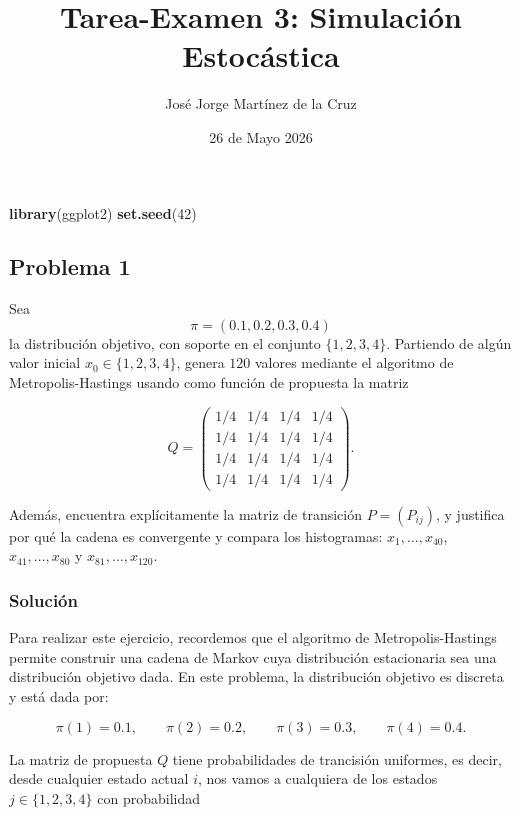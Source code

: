 \documentclass[
]{article}
\title{Tarea-Examen 3: Simulación Estocástica}
\author{José Jorge Martínez de la Cruz}
\date{26 de Mayo 2026}
\newenvironment{Shaded}{\begin{snugshade}}{\end{snugshade}}
\newcommand{\DecValTok}[1]{\textcolor[rgb]{0.00,0.00,0.81}{#1}}
\newcommand{\FunctionTok}[1]{\textcolor[rgb]{0.13,0.29,0.53}{\textbf{#1}}}
\newcommand{\NormalTok}[1]{#1}
\begin{document}
\maketitle

\begin{Shaded}
\begin{Highlighting}[]
\FunctionTok{library}\NormalTok{(ggplot2)}
\FunctionTok{set.seed}\NormalTok{(}\DecValTok{42}\NormalTok{)}
\end{Highlighting}
\end{Shaded}

\subsection{Problema 1}\label{problema-1}

Sea \[
\pi = (0.1,0.2,0.3,0.4)
\] la distribución objetivo, con soporte en el conjunto \(\{1,2,3,4\}\).
Partiendo de algún valor inicial \(x_0 \in \{1,2,3,4\}\), genera \(120\)
valores mediante el algoritmo de Metropolis-Hastings usando como función
de propuesta la matriz

\[
Q =
\begin{pmatrix}
1/4 & 1/4 & 1/4 & 1/4\\
1/4 & 1/4 & 1/4 & 1/4\\
1/4 & 1/4 & 1/4 & 1/4\\
1/4 & 1/4 & 1/4 & 1/4
\end{pmatrix}.
\]

Además, encuentra explícitamente la matriz de transición \(P=(P_{ij})\),
y justifica por qué la cadena es convergente y compara los histogramas:
\(x_1,\ldots,x_{40}\), \(x_{41},\ldots,x_{80}\) y
\(x_{81},\ldots,x_{120}\).

\subsubsection{Solución}\label{soluciuxf3n}

Para realizar este ejercicio, recordemos que el algoritmo de
Metropolis-Hastings permite construir una cadena de Markov cuya
distribución estacionaria sea una distribución objetivo dada. En este
problema, la distribución objetivo es discreta y está dada por:

\[
\pi(1)=0.1, \qquad \pi(2)=0.2, \qquad \pi(3)=0.3, \qquad \pi(4)=0.4.
\]

La matriz de propuesta \(Q\) tiene probabilidades de trancisión
uniformes, es decir, desde cualquier estado actual \(i\), nos vamos a
cualquiera de los estados \(j\in\{1,2,3,4\}\) con probabilidad
\end{document}

